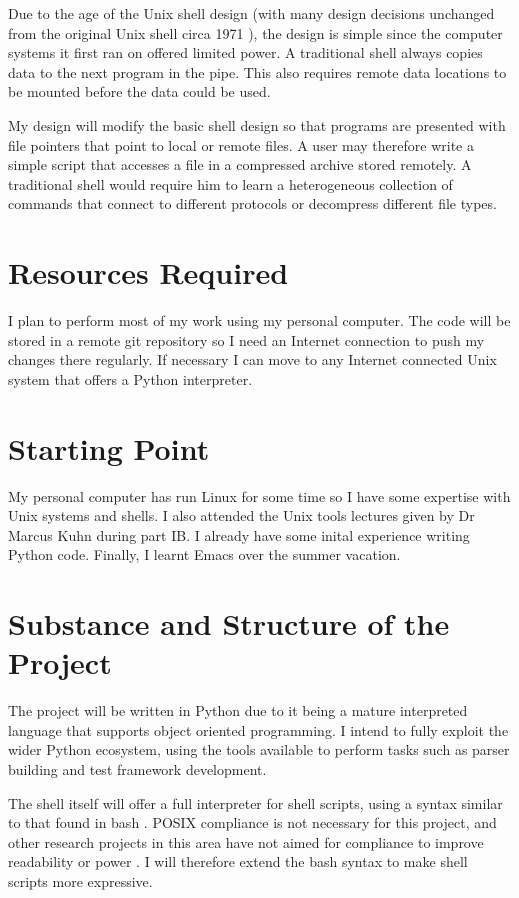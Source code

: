 \documentclass[12pt]{article}
\begin{document}
Due to the age of the Unix shell design (with many design decisions
unchanged from the original Unix shell circa 1971 \cite{firstshell}),
the design is simple since the computer systems it first ran on
offered limited power. A traditional shell always copies data to the
next program in the pipe. This also requires remote data locations to
be mounted before the data could be used.

My design will modify the basic shell design so that programs are
presented with file pointers that point to local or remote files. A
user may therefore write a simple script that accesses a file in a
compressed archive stored remotely. A traditional shell would require
him to learn a heterogeneous collection of commands that connect to
different protocols or decompress different file types.

\section*{Resources Required}
I plan to perform most of my work using my personal computer. The code
will be stored in a remote git repository so I need an Internet
connection to push my changes there regularly. If necessary I can move
to any Internet connected Unix system that offers a Python interpreter.

\section*{Starting Point}
My personal computer has run Linux for some time so I have some
expertise with Unix systems and shells. I also attended the Unix tools
lectures given by Dr Marcus Kuhn during part IB. I already have some
inital experience writing Python code. Finally, I learnt Emacs over
the summer vacation.

\section*{Substance and Structure of the Project}
The project will be written in Python due to it being a mature
interpreted language that supports object oriented programming. I
intend to fully exploit the wider Python ecosystem, using the tools
available to perform tasks such as parser building and test framework
development.

The shell itself will offer a full interpreter for shell scripts,
using a syntax similar to that found in bash \cite{bash}. POSIX
compliance \cite{posix} is not necessary for this project, and other
research projects in this area have not aimed for compliance to improve
readability \cite{fish} or power \cite{powershell}. I will therefore
extend the bash syntax to make shell scripts more expressive. 
\end{document}
